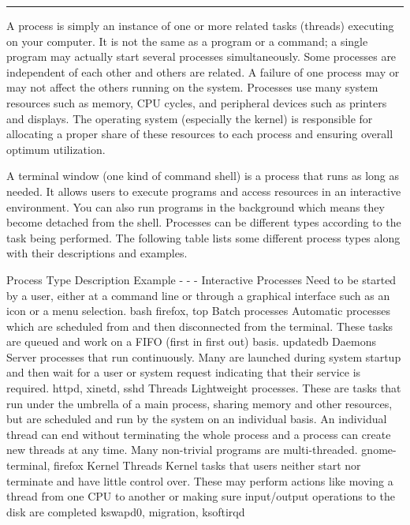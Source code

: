 \begin{center}\rule{3in}{0.4pt}\end{center}

A process is simply an instance of one or more related tasks (threads)
executing on your computer. It is not the same as a program or a
command; a single program may actually start several processes
simultaneously. Some processes are independent of each other and others
are related. A failure of one process may or may not affect the others
running on the system. Processes use many system resources such as
memory, CPU cycles, and peripheral devices such as printers and
displays. The operating system (especially the kernel) is responsible
for allocating a proper share of these resources to each process and
ensuring overall optimum utilization.

A terminal window (one kind of command shell) is a process that runs as
long as needed. It allows users to execute programs and access resources
in an interactive environment. You can also run programs in the
background which means they become detached from the shell. Processes
can be different types according to the task being performed. The
following table lists some different process types along with their
descriptions and examples.

Process Type \textbar{} Description \textbar{} Example - \textbar{} -
\textbar{} - Interactive Processes \textbar{} Need to be started by a
user, either at a command line or through a graphical interface such as
an icon or a menu selection. \textbar{} bash firefox, top Batch
processes \textbar{} Automatic processes which are scheduled from and
then disconnected from the terminal. These tasks are queued and work on
a FIFO (first in first out) basis. \textbar{} updatedb Daemons
\textbar{} Server processes that run continuously. Many are launched
during system startup and then wait for a user or system request
indicating that their service is required. \textbar{} httpd, xinetd,
sshd Threads \textbar{} Lightweight processes. These are tasks that run
under the umbrella of a main process, sharing memory and other
resources, but are scheduled and run by the system on an individual
basis. An individual thread can end without terminating the whole
process and a process can create new threads at any time. Many
non-trivial programs are multi-threaded. \textbar{} gnome-terminal,
firefox Kernel Threads \textbar{} Kernel tasks that users neither start
nor terminate and have little control over. These may perform actions
like moving a thread from one CPU to another or making sure input/output
operations to the disk are completed \textbar{} kswapd0, migration,
ksoftirqd

